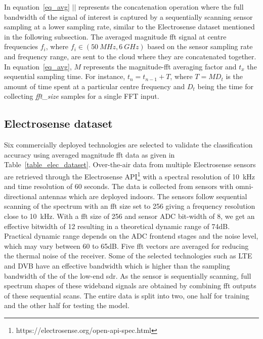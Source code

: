 In equation~\ref{eq_avg} $||$ represents the concatenation operation where the full bandwidth of the signal of interest is captured by a sequentially scanning sensor sampling at a lower sampling rate, similar to the Electrosense dataset mentioned in the following subsection. The averaged magnitude \ac{fft} signal at centre frequencies $f_i$, where $f_i \in (50~MHz, 6~GHz)$ based on the sensor sampling rate and frequency range, are sent to the cloud where they are concatenated together. In equation~\ref{eq_avg}, $M$ represents the magnitude-\ac{fft} averaging factor and $t_x$ the sequential sampling time. For instance, $t_n = t_{n-1}+T$, where $T=MD_t$ is the amount of time spent at a particular centre frequency and $D_t$ being the time for collecting \textit{fft\_size} samples for a single FFT input.


\subsection{Electrosense dataset}
\label{electrosense_dataset}
Six commercially deployed technologies are selected to validate the classification accuracy using averaged magnitude \ac{fft} data as given in Table~\ref{table_elec_dataset}. Over-the-air data from multiple Electrosense sensors are retrieved through the Electrosense API\footnote{\label{noteapi}https://electrosense.org/open-api-spec.html} with a spectral resolution of 10~kHz and time resolution of 60 seconds. The data is collected from sensors with omni-directional antennas which are deployed indoors. The sensors follow sequential scanning of the spectrum with an \ac{fft} size set to 256 giving a frequency resolution close to 10~kHz. With a \ac{fft} size of 256 and sensor ADC bit-width of 8, we get an effective bitwidth of 12 resulting in a theoretical dynamic range of 74dB. Practical dynamic range depends on the ADC frontend stages and the noise level, which may vary between 60 to 65dB. Five \ac{fft} vectors are averaged for reducing the thermal noise of the receiver. Some of the selected technologies such as LTE and DVB have an effective bandwidth which is higher than the sampling bandwidth of the of the low-end \ac{sdr}. As the sensor is sequentially scanning, full spectrum shapes of these wideband signals are obtained by combining \ac{fft} outputs of these sequential scans. The entire data is split into two, one half for training and the other half for testing the model. %

